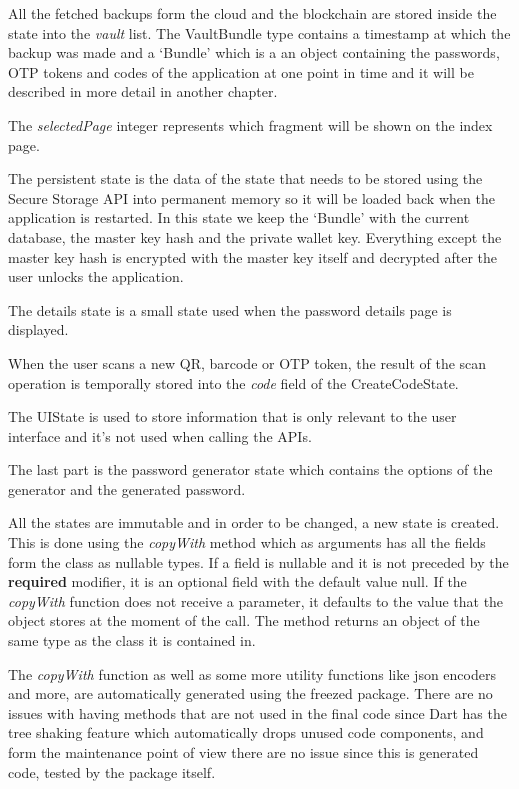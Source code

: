 \documentclass[a4paper,12pt]{report}
\begin{document}
All the fetched backups form the cloud and the blockchain are stored inside the
state into the \textit{vault} list. The VaultBundle type contains a timestamp
at which the backup was made and a `Bundle' which is a an object containing the
passwords, OTP tokens and codes of the application at one point in time and it
will be described in more detail in another chapter.

The \textit{selectedPage} integer represents which fragment will be shown on
the index page.

The persistent state is the data of the state that needs to be stored using the
Secure Storage API into permanent memory so it will be loaded back when the
application is restarted. In this state we keep the `Bundle' with the current
database, the master key hash and the private wallet key. Everything except the
master key hash is encrypted with the master key itself and decrypted after the
user unlocks the application.

The details state is a small state used when the password details page is
displayed.

When the user scans a new QR, barcode or OTP token, the result of the scan
operation is temporally stored into the \textit{code} field of the
CreateCodeState.

The UIState is used to store information that is only relevant to the user
interface and it's not used when calling the APIs.

The last part is the password generator state which contains the options of the
generator and the generated password.

All the states are immutable and in order to be changed, a new state is
created. This is done using the \textit{copyWith} method which as arguments has
all the fields form the class as nullable types. If a field is nullable and it
is not preceded by the \textbf{required} modifier, it is an optional field with
the default value null. If the \textit{copyWith} function does not receive a
parameter, it defaults to the value that the object stores at the moment of the
call. The method returns an object of the same type as the class it is
contained in.

The \textit{copyWith} function as well as some more utility functions like json
encoders and more, are automatically generated using the
freezed\cite{freezedDocs} package. There are no issues with having methods that
are not used in the final code since Dart has the tree shaking feature which
automatically drops unused code components, and form the maintenance point of
view there are no issue since this is generated code, tested by the package
itself.
\end{document}

